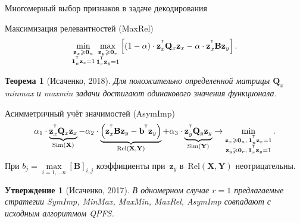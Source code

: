 \documentclass[9pt]{beamer}
\renewcommand{\geq}{\ensuremath{\geqslant}}
\newcommand{\bb}{\mathbf{b}}
\newcommand{\bz}{\mathbf{z}}
\newcommand{\bB}{\mathbf{B}}
\newcommand{\bQ}{\mathbf{Q}}
\newcommand{\bX}{\mathbf{X}}
\newcommand{\bY}{\mathbf{Y}}
\newcommand{\T}{^{\text{\tiny\sffamily\upshape\mdseries T}}}
\newcommand{\bOne}{\boldsymbol{1}}
\newcommand{\bZero}{\boldsymbol{0}}
\newtheorem{statement}{Утверждение}
\newtheorem{rustheorem}{Теорема}
\begin{document}
\begin{frame}{Многомерный выбор признаков в задаче декодирования}
	\begin{block}{Максимизация релевантностей (MaxRel)}
	\[
		\min_{\substack{\bz_x \geq \bZero_n \\ \bOne_n^{\T}\bz_x=1}} 	\max_{\substack{\bz_y \geq \bZero_r \\ \bOne_r^{\T}\bz_y=1}} \left[ (1 - \alpha) \cdot \bz_x^{\T} \bQ_x \bz_x - \alpha \cdot \bz_x^{\T} \bB \bz_y \right].
	\]
	\end{block}
	\begin{rustheorem}[Исаченко, 2018]
		Для положительно определенной матрицы $\bQ_x$ minmax и maxmin задачи достигают одинакового значения функционала.
	\end{rustheorem}
	\begin{block}{Асимметричный учёт значимостей (AsymImp)}
	\begin{equation*}
	\alpha_1 \cdot \underbrace{\bz_x^{\T} \bQ_x \bz_x}_{\text{Sim}(\bX)} - \alpha_2 \cdot  \underbrace{\left(\bz_x^{\T} \bB \bz_y - \bb^{\T} \bz_y \right) }_{\text{Rel}(\bX, \bY)} + \alpha_3 \cdot \underbrace{\bz_y^{\T} \bQ_y \bz_y}_{\text{Sim}(\bY)} \rightarrow \min_{\substack{\bz_x \geq \bZero_n, \, \bOne_n^{\T}\bz_x=1 \\ \bz_y \geq \bZero_r, \, \bOne_r^{\T}\bz_y=1}}.
	\end{equation*}
	При $b_j = \max\limits_{i=1, \dots n} [\bB]_{i, j}$ коэффициенты при~$\bz_y$ в~$\text{Rel}(\bX, \bY)$ неотрицательны.
	
	\begin{statement}[Исаченко, 2017]
		В одномерном случае $r=1$ предлагаемые стратегии SymImp, MinMax, MaxMin, MaxRel, AsymImp совпадают с исходным алгоритмом QPFS.
	\end{statement}
\end{block}
\end{frame}
\end{document}
